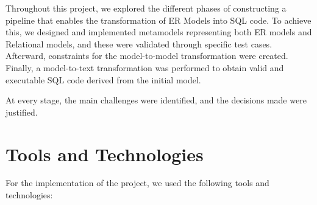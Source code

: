 \documentclass[10pt]{article}
\begin{document}
Throughout this project, we explored the different phases of constructing a pipeline that enables the transformation of ER Models into SQL code. To achieve this, we designed and implemented metamodels representing both ER models and Relational models, and these were validated through specific test cases. Afterward, constraints for the model-to-model transformation were created. Finally, a model-to-text transformation was performed to obtain valid and executable SQL code derived from the initial model.

At every stage, the main challenges were identified, and the decisions made were justified.

\section{Tools and Technologies}

For the implementation of the project, we used the following tools and technologies:
\end{document}
